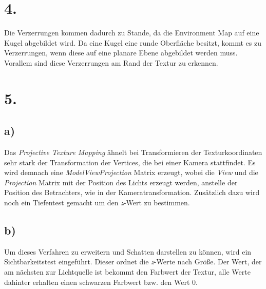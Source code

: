 \documentclass[12pt]{scrreprt}
\begin{document}
\section*{4.}
Die Verzerrungen kommen dadurch zu Stande, da die Environment Map auf eine Kugel abgebildet wird. Da eine Kugel eine runde Oberfläche besitzt, kommt es zu Verzerrungen, wenn diese auf eine planare Ebene abgebildet werden muss. Vorallem sind diese Verzerrungen am Rand der Textur zu erkennen.
\section*{5.}
\subsection*{a)}
Das \emph{Projective Texture Mapping} ähnelt bei Transformieren der Texturkoordinaten sehr stark der Transformation der Vertices, die bei einer Kamera stattfindet. Es wird demnach eine \emph{ModelViewProjection} Matrix erzeugt, wobei die \emph{View} und die \emph{Projection} Matrix mit der Position des Lichts erzeugt werden, anstelle der Position des Betrachters, wie in der Kameratransformation. Zusätzlich dazu wird noch ein Tiefentest gemacht um den \emph{z}-Wert zu bestimmen.
\subsection*{b)}
Um dieses Verfahren zu erweitern und Schatten darstellen zu können, wird ein Sichtbarkeitstest eingeführt. Dieser ordnet die \emph{z}-Werte nach Größe. Der Wert, der am nächsten zur Lichtquelle ist bekommt den Farbwert der Textur, alle Werte dahinter erhalten einen schwarzen Farbwert bzw. den Wert 0.
\end{document}
